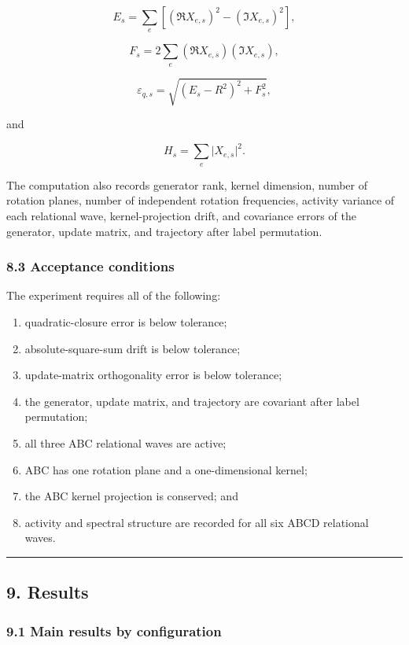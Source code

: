 \documentclass[
  10pt,
  a4paper,
]{article}
\providecommand{\tightlist}{%
  \setlength{\itemsep}{0pt}\setlength{\parskip}{0pt}}
\begin{document}
\[
E_s
=
\sum_e
\left[
(\Re X_{e,s})^2
-(\Im X_{e,s})^2
\right],
\]

\[
F_s
=
2\sum_e
(\Re X_{e,s})(\Im X_{e,s}),
\]

\[
\varepsilon_{q,s}
=
\sqrt{(E_s-R^2)^2+F_s^2},
\]

and

\[
H_s
=
\sum_e\lvert X_{e,s}\rvert^2.
\]

The computation also records generator rank, kernel dimension, number of
rotation planes, number of independent rotation frequencies, activity
variance of each relational wave, kernel-projection drift, and
covariance errors of the generator, update matrix, and trajectory after
label permutation.

\subsubsection{8.3 Acceptance conditions}\label{acceptance-conditions}

The experiment requires all of the following:

\begin{enumerate}
\def\labelenumi{\arabic{enumi}.}
\tightlist
\item
  quadratic-closure error is below tolerance;
\item
  absolute-square-sum drift is below tolerance;
\item
  update-matrix orthogonality error is below tolerance;
\item
  the generator, update matrix, and trajectory are covariant after label
  permutation;
\item
  all three ABC relational waves are active;
\item
  ABC has one rotation plane and a one-dimensional kernel;
\item
  the ABC kernel projection is conserved; and
\item
  activity and spectral structure are recorded for all six ABCD
  relational waves.
\end{enumerate}

\begin{center}\rule{0.5\linewidth}{0.5pt}\end{center}

\subsection{9. Results}\label{results}

\subsubsection{9.1 Main results by
configuration}\label{main-results-by-configuration}
\end{document}
